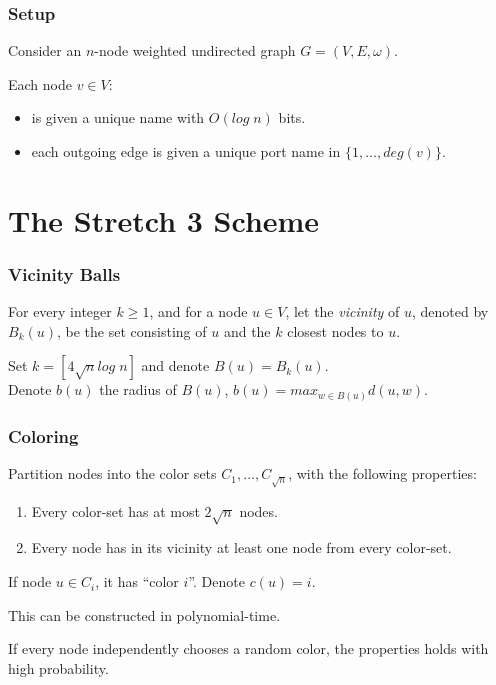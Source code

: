 \documentclass[10pt, compress]{beamer}
\begin{document}
\begin{frame}[fragile]
  \frametitle{Setup}
    Consider an $n$-node weighted undirected graph $G=(V,E,\omega)$.

    Each node $v\in V$:
    \begin{itemize}
        \item is given a unique name with $O(log\; n)$ bits.
        \item each outgoing edge is given a unique port name in $\{1,\dots,deg(v)\}$.
    \end{itemize}
\end{frame}



\section{The Stretch 3 Scheme}

\begin{frame}[fragile]
  \frametitle{Vicinity Balls}

  For every integer $k \geq 1$, and for a node $u \in V$, let the \textit{vicinity} of $u$, denoted by $B_k(u)$, be the set consisting of $u$ and the $k$ closest nodes to $u$.

  Set $k=[4 \sqrt{n}log\; n]$ and denote $B(u) = B_k(u)$.\\
  Denote $b(u)$ the radius of $B(u)$, $b(u)=max_{w\in B(u)} d(u,w)$.


\end{frame}

\begin{frame}[fragile]
  \frametitle{Coloring}

  Partition nodes into the color sets $C_1,\dots,C_{\sqrt{n}}$, with the following properties:
  \begin{enumerate}
    \item Every color-set has at most $2 \sqrt{n}$ nodes.
    \item Every node has in its vicinity at least one node from every color-set.
  \end{enumerate}

  If node $u\in C_i$, it has ``color $i$''. Denote $c(u)=i$.

  This can be constructed in polynomial-time.

  If every node independently chooses a random color, the properties holds with high probability.


\end{frame}
\end{document}
